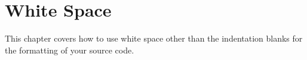 \section{White Space}\label{sec:WhiteSpace}
This chapter covers how to use white space other than the indentation blanks for the formatting of your \Java source code.






